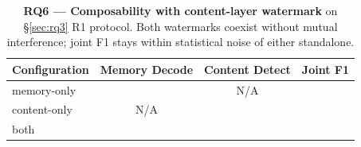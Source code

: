 \begin{table}[t]
\centering
\small
\setlength{\tabcolsep}{4pt}
\begin{tabular}{lccc}
\toprule
Configuration & Memory Decode & Content Detect & Joint F1 \\
\midrule
memory-only  & \todo{} & N/A     & \todo{} \\
content-only & N/A     & \todo{} & \todo{} \\
both         & \todo{} & \todo{} & \todo{} \\
\bottomrule
\end{tabular}
\caption{\textbf{RQ6 — Composability with content-layer watermark}
on \S\ref{sec:rq3} R1 protocol. Both watermarks coexist without
mutual interference; joint F1 stays within statistical noise of
either standalone.}
\label{tab:composability}
\end{table}
